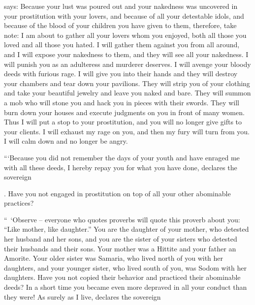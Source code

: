 {{}
says: Because
your lust
was poured out
and your nakedness
was uncovered
in your prostitution
with
your lovers,
and because of all
your detestable
idols,
and because of the blood
of your children
you have given to them,
therefore,
take note: I am about
to gather
all
your lovers
whom
you enjoyed,
both all
those
you loved
and all
those you hated.
I will gather
them against
you from all around,
and I will expose
your nakedness
to
them, and they will see
all
your nakedness.
I will punish you as an adulteress
and murderer
deserves. I will
avenge
your bloody
deeds with furious
rage.
I will give
you into their hands
and they will destroy
your chambers
and tear down
your pavilions.
They will strip
you of your clothing
and take
your beautiful
jewelry
and leave
you naked
and bare.
They will summon a mob
who will stone
you and hack
you in pieces with
their swords.
They will burn down
your houses
and execute
judgments
on you in front of many
women.
Thus I will put
a stop
to your prostitution,
and you will no
longer
give
gifts to your clients.
I will exhaust
my rage
on you, and then my fury
will turn
from
you. I will calm
down and no
longer
be angry.
\par }{\PP {}“‘Because
you did not
remember
the
days
of your youth
and have enraged
me with all
these
deeds, I
hereby
repay
you for what you have done,
declares
the sovereign

{}. Have you not
engaged
in prostitution
on top
of all
your other abominable practices?
\par }{\PP {}“ ‘Observe – everyone who quotes proverbs will quote this proverb about you: “Like mother, like daughter.”
You are
the daughter
of your mother,
who detested
her husband
and her sons,
and you are
the sister
of your sisters
who
detested
their husbands
and their sons.
Your mother
was a Hittite
and your father
an Amorite.
Your older
sister
was Samaria,
who lived
north
of you with her daughters,
and your younger
sister,
who lived
south
of you, was Sodom
with her daughters.
Have you not
copied
their behavior
and practiced
their abominable deeds? In a short
time you became even more
depraved
in all
your conduct
than they were!
As surely
as I
live, declares
the sovereign

}
